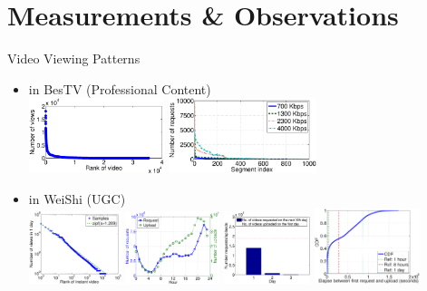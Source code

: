 \documentclass{beamer}
\begin{document}
\section{Measurements \& Observations}
\begin{frame}{Video Viewing Patterns}
	\begin{itemize}
		\item<1> in BesTV (Professional Content)\\
		\includegraphics[height=2.2cm]{fig/video-freq.eps}
		\includegraphics[height=2.2cm]{fig/sy-req-vs-seg.eps}
		\item<1> in WeiShi (UGC)\\
		\includegraphics[height=2.1cm]{fig/video-popularity.eps}
		\includegraphics[height=2.1cm]{fig/request-upload-overtime.eps}
		\includegraphics[height=2.1cm]{fig/view-in-3-days.eps}
		\includegraphics[height=2.2cm]{fig/updowntimediff.eps}
	\end{itemize}
\end{frame}
\end{document}
